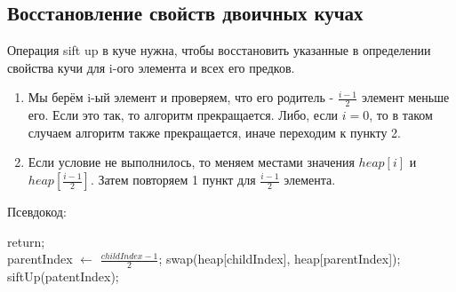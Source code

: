 \newpage
\subsection{Восстановление свойств двоичных кучах}\label{subsec:---4}

\begin{operation}
    \hypertarget{su}{}
    Операция sift up в куче нужна,
    чтобы восстановить указанные в определении свойства кучи для i-ого элемента и всех его предков.
    \begin{enumerate}
        \item Мы берём i-ый элемент и проверяем, что его родитель - $\frac{i - 1}{2}$ элемент меньше его.
        Если это так, то алгоритм прекращается. Либо, если $i = 0$, то в таком случаем алгоритм также прекращается,
        иначе переходим к пункту 2.
        \item Если условие не выполнилось, то меняем местами значения $heap[i]$ и $heap[\frac{i - 1}{2}]$.
        Затем повторяем 1 пункт для $\frac{i - 1}{2}$ элемента.
    \end{enumerate}
    Псевдокод:
    \begin{algorithmic}[0]
                \State return;
            \EndIf\\
            \State parentIndex $\gets$ \large{$\frac{childIndex - 1}{2}$};
                \State swap(heap[childIndex], heap[parentIndex]);
                \State siftUp(patentIndex);
            \EndIf

        \EndFunction
    \end{algorithmic}
\end{operation}

